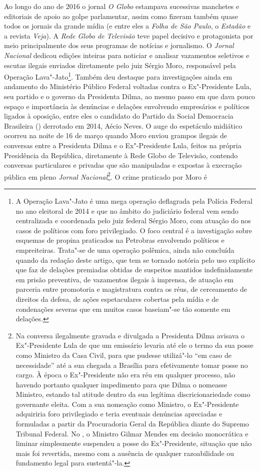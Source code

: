 Ao longo do ano de 2016 o jornal \emph{O Globo} estampava sucessivas manchetes
e editoriais de apoio ao golpe parlamentar, assim como fizeram também
quase todos os jornais da grande mídia (e entre eles a \emph{Folha de São
Paulo}, o \emph{Estadão} e a revista \emph{Veja}). A \emph{Rede Globo de Televisão} teve
papel decisivo e protagonista por meio principalmente dos seus programas
de notícias e jornalismo. O \emph{Jornal Nacional} dedicou edições inteiras
para noticiar e analisar vazamentos seletivos e escutas ilegais enviados
diretamente pelo juiz Sérgio Moro, responsável pela Operação
Lava"-Jato\footnote{A Operação Lava"-Jato é uma mega operação deflagrada
  pela Polícia Federal no ano eleitoral de 2014 e que no âmbito do
  judiciário federal vem sendo centralizada e coordenada pelo juiz
  federal Sérgio Moro, com atuação do  nos casos de políticos com
  foro privilegiado. O foco central é a investigação sobre esquemas de
  propina praticados na Petrobras envolvendo políticos e empreiteiras.
  Trata"-se de uma operação polêmica, ainda não concluída quando da
  redação deste artigo, que tem se tornado notória pelo uso explícito
  que faz de delações premiadas obtidas de suspeitos mantidos
  indefinidamente em prisão preventiva, de vazamentos ilegais à
  imprensa, de atuação em parceria entre promotoria e magistratura
  contra os réus, de cerceamento de direitos da defesa, de ações
  espetaculares cobertas pela mídia e de condenações severas que em
  muitos casos baseiam"-se tão somente em delações.}. Também deu destaque
para investigações ainda em andamento do Ministério Público Federal
voltadas contra o Ex"-Presidente Lula, seu partido e o governo da
Presidenta Dilma, ao mesmo passo em que dava pouco espaço e importância
às denúncias e delações envolvendo empresários e políticos ligados
à oposição, entre eles o candidato do Partido da Social
Democracia Brasileira () derrotado em 2014,
Aécio Neves. O auge do espetáculo
midiático ocorreu na noite de 16 de março quando Moro enviou grampos
ilegais de conversas entre a Presidenta Dilma e o Ex"-Presidente Lula,
feitos na própria Presidência da República, diretamente à Rede Globo de
Televisão, contendo conversas particulares e privadas que são
manipuladas e expostas à execração pública em pleno \emph{Jornal
Nacional}\footnote{Na conversa ilegalmente gravada e divulgada a
  Presidenta Dilma avisava o Ex"-Presidente Lula de que um emissário
  levaria até ele o termo da sua posse como Ministro da Casa Civil, para
  que pudesse utilizá"-lo ``em caso de necessidade'' até a sua chegada a
  Brasília para efetivamente tomar posse no cargo. À época o
  Ex"-Presidente não era réu em qualquer processo, não havendo portanto
  qualquer impedimento para que Dilma o nomeasse Ministro, estando tal
  atitude dentro da sua legítima discricionariedade como governante
  eleita. Com a sua nomeação como Ministro, o Ex"-Presidente adquiriria
  foro privilegiado e teria eventuais denúncias apreciadas e formuladas
  a partir da Procuradoria Geral da República diante do Supremo Tribunal
  Federal. No , o Ministro Gilmar Mendes em decisão monocrática e
  liminar simplesmente suspendeu a posse do Ex"-Presidente, situação que
  não mais foi revertida, mesmo com a ausência de qualquer razoabilidade
  ou fundamento legal para sustentá"-la.}. O crime praticado por Moro é
